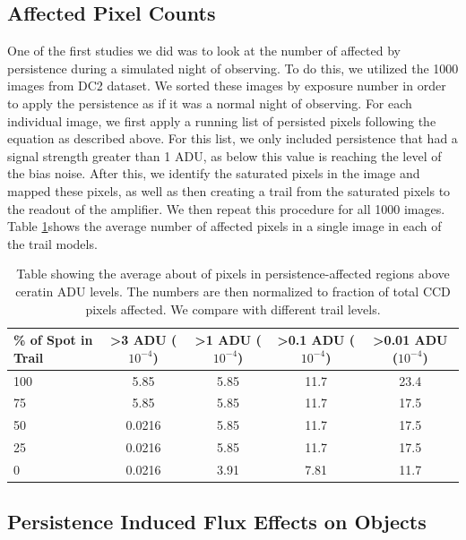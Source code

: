 \documentclass[DM,authoryear,toc]{lsstdoc}
\begin{document}
\subsection{Affected Pixel Counts}

One of the first studies we did was to look at the number of affected by persistence during a simulated night of observing.
To do this, we utilized the 1000  images from DC2 dataset. 
We sorted these images by exposure number in order to apply the persistence as if it was a normal night of observing.
For each individual image, we first apply a running list of persisted pixels following the equation as described above.
For this list, we only included persistence that had a signal strength greater than 1 ADU, as below this value is reaching the level of the bias noise.
After this, we identify the saturated pixels in the image and mapped these pixels, as well as then creating a trail from the saturated pixels to the readout of the amplifier.
We then repeat this procedure for all 1000 images.
Table \ref{tab:persis_affected}shows the average number of affected pixels in a single image in each of the trail models.

\begin{table}[h!]
\centering
\begin{tabular}{|lcccc|}
\hline
\% of Spot in Trail & >3 ADU ($10^{-4}$) & >1 ADU ($10^{-4}$) & >0.1 ADU ($10^{-4}$) & >0.01 ADU ($10^{-4}$) \\
\hline
100 & 5.85 & 5.85 & 11.7 & 23.4 \\
75 & 5.85 & 5.85 & 11.7 & 17.5 \\
50 & 0.0216 & 5.85 & 11.7 & 17.5 \\
25 & 0.0216 & 5.85 & 11.7 & 17.5 \\
0 & 0.0216 & 3.91 & 7.81 & 11.7 \\
\hline
\end{tabular}\label{tab:persis_affected}
\caption{Table showing the average about of pixels in persistence-affected regions above ceratin ADU levels. 
The numbers are then normalized to fraction of total CCD pixels affected.
We compare with different trail levels.
}  
\end{table}



\subsection{Persistence Induced Flux Effects on Objects}
\end{document}
